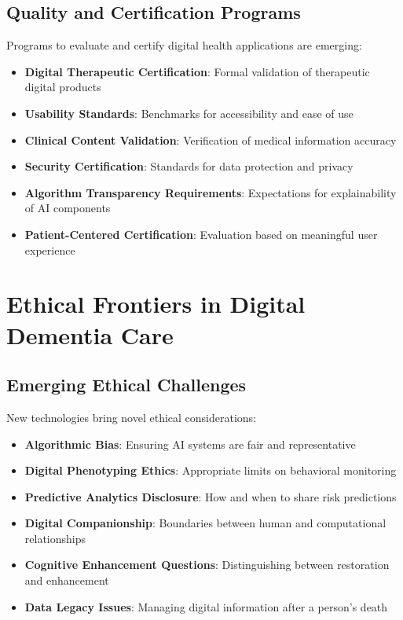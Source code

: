 \subsection{Quality and Certification Programs}
Programs to evaluate and certify digital health applications are emerging:

\begin{itemize}
    \item \textbf{Digital Therapeutic Certification}: Formal validation of therapeutic digital products
    
    \item \textbf{Usability Standards}: Benchmarks for accessibility and ease of use
    
    \item \textbf{Clinical Content Validation}: Verification of medical information accuracy
    
    \item \textbf{Security Certification}: Standards for data protection and privacy
    
    \item \textbf{Algorithm Transparency Requirements}: Expectations for explainability of AI components
    
    \item \textbf{Patient-Centered Certification}: Evaluation based on meaningful user experience
\end{itemize}

\section{Ethical Frontiers in Digital Dementia Care}
\subsection{Emerging Ethical Challenges}
New technologies bring novel ethical considerations:

\begin{itemize}
    \item \textbf{Algorithmic Bias}: Ensuring AI systems are fair and representative
    
    \item \textbf{Digital Phenotyping Ethics}: Appropriate limits on behavioral monitoring
    
    \item \textbf{Predictive Analytics Disclosure}: How and when to share risk predictions
    
    \item \textbf{Digital Companionship}: Boundaries between human and computational relationships
    
    \item \textbf{Cognitive Enhancement Questions}: Distinguishing between restoration and enhancement
    
    \item \textbf{Data Legacy Issues}: Managing digital information after a person's death
\end{itemize}

